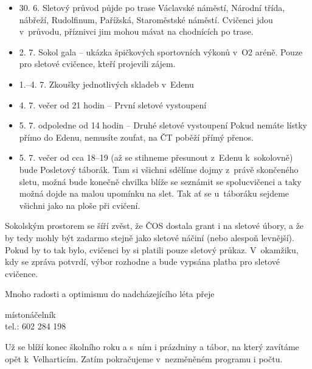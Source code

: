 \documentclass[11pt]{article}
\begin{document}
\begin{itemize}[
  itemsep=-3pt,
  leftmargin=2em,
  itemindent=-1em
]
  \item[] 30. 6. Sletový průvod půjde po trase Václavské náměstí, Národní třída, nábřeží, Rudolfinum, Pařížská, Staroměstské náměstí. Cvičenci jdou v~průvodu, příznivci jim mohou mávat na chodnících po trase.
  \item[] 2. 7. Sokol gala – ukázka špičkových sportovních výkonů v~O2 aréně. Pouze pro sletové cvičence, kteří projevili zájem.
  \item[] 1.–4. 7. Zkoušky jednotlivých skladeb v~Edenu
  \item[] 4. 7. večer od 21 hodin – První sletové vystoupení
  \item[] 5. 7. odpoledne od 14 hodin – Druhé sletové vystoupení
Pokud nemáte lístky přímo do Edenu, nemusíte zoufat, na ČT poběží přímý přenos.
  \item[] 5. 7. večer od cca 18–19 (až se stihneme přesunout z~Edenu k~sokolovně) bude Posletový táborák. Tam si všichni sdělíme dojmy z~právě skončeného sletu, možná bude konečně chvilka blíže se seznámit se spolucvičenci a taky možná dojde na malou upomínku na slet. Tak ať se u~táboráku sejdeme všichni jako na ploše při cvičení.
\end{itemize}

Sokolským prostorem se šíří zvěst, že ČOS dostala grant i na sletové úbory, a že by tedy mohly být zadarmo stejně jako sletové náčiní (nebo alespoň levnější). Pokud by to tak bylo, cvičenci by si platili pouze sletový průkaz. V~okamžiku, kdy se zpráva potvrdí, výbor rozhodne a bude vypsána platba pro sletové cvičence.

Mnoho radosti a optimismu do nadcházejícího léta přeje

\signature{Jiří Novák (Jirkan)}{místonáčelník\\tel.: 602 284 198}

Už se blíží konec školního roku a s~ním i prázdniny a tábor, na který zavítáme opět k~Velharticím. Zatím pokračujeme v~nezměněném programu i počtu.
\end{document}
